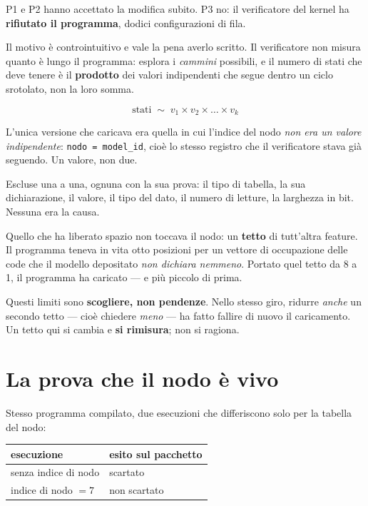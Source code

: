\documentclass[11pt,a4paper,oneside]{report}
\begin{document}
P1 e P2 hanno accettato la modifica subito. P3 no: il verificatore del kernel ha
\textbf{rifiutato il programma}, dodici configurazioni di fila.

Il motivo è controintuitivo e vale la pena averlo scritto. Il verificatore non
misura quanto è lungo il programma: esplora i \emph{cammini} possibili, e il
numero di stati che deve tenere è il \textbf{prodotto} dei valori indipendenti
che segue dentro un ciclo srotolato, non la loro somma.

\[
  \text{stati} \;\sim\; v_1 \times v_2 \times \dots \times v_k
\]

L'unica versione che caricava era quella in cui l'indice del nodo \emph{non era
un valore indipendente}: \texttt{nodo = model\_id}, cioè lo stesso registro che
il verificatore stava già seguendo. Un valore, non due.

Escluse una a una, ognuna con la sua prova: il tipo di tabella, la sua
dichiarazione, il valore, il tipo del dato, il numero di letture, la larghezza
in bit. Nessuna era la causa.

Quello che ha liberato spazio non toccava il nodo: un \textbf{tetto} di tutt'altra
feature. Il programma teneva in vita otto posizioni per un vettore di occupazione
delle code che il modello depositato \emph{non dichiara nemmeno}. Portato quel
tetto da 8 a 1, il programma ha caricato --- e più piccolo di prima.

\begin{lezione}
Questi limiti sono \textbf{scogliere, non pendenze}. Nello stesso giro, ridurre
\emph{anche} un secondo tetto --- cioè chiedere \emph{meno} --- ha fatto fallire
di nuovo il caricamento. Un tetto qui si cambia e \textbf{si rimisura}; non si
ragiona.
\end{lezione}

\section{La prova che il nodo è vivo}

Stesso programma compilato, due esecuzioni che differiscono solo per la tabella
del nodo:

\begin{center}
\small
\begin{tabular}{@{}ll@{}}
\toprule
\textbf{esecuzione} & \textbf{esito sul pacchetto} \\
\midrule
senza indice di nodo & scartato \\
indice di nodo $= 7$ & non scartato \\
\bottomrule
\end{tabular}
\end{center}
\end{document}
